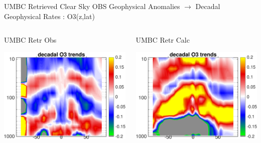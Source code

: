 \documentclass[10pt,t]{beamer}
\begin{document}
\begin{frame}{UMBC Retrieved Clear Sky OBS Geophysical Anomalies $\rightarrow$ Decadal Geophysical Rates : O3(z,lat)}
\begin{columns}
\begin{column}{0.45\columnwidth}
\begin{block}{\footnotesize UMBC Retr Obs}
\vspace{-0.1in}
\begin{center}
\includegraphics[width=\linewidth]{Figs/ClearAnom/umbc_clr_retr_obs_o3_rate_200209_201808.png}
\end{center}
\end{block}
\end{column}

\begin{column}{0.45\columnwidth}
\begin{block}{\footnotesize UMBC Retr Calc}
\vspace{-0.1in}
\begin{center}
\includegraphics[width=\linewidth]{Figs/ClearAnom/umbc_clr_retr_cal_o3_rate_200209_201808.png}
\end{center}
\end{block}
\end{column}
\end{columns}

\end{frame}
\end{document}

